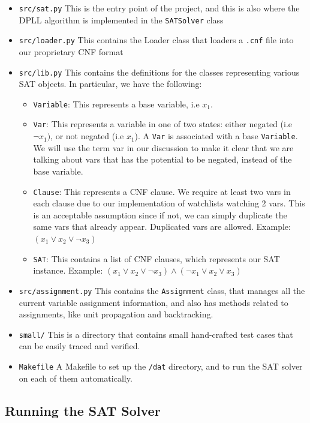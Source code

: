 \documentclass[11pt]{article}
\begin{document}
\begin{itemize}
  \item \texttt{src/sat.py} This is the entry point of the project, and this is also where the DPLL algorithm is implemented  in the \texttt{SATSolver} class
  \item \texttt{src/loader.py} This contains the \textsf{Loader} class that loaders a \texttt{.cnf} file into our proprietary CNF format
  \item \texttt{src/lib.py} This contains the definitions for the classes representing various SAT objects. In particular, we have the following:
    \begin{itemize}
      \item \texttt{Variable}: This represents a base variable, i.e $x_1$.
      \item \texttt{Var}: This represents a variable in one of two states: either negated (i.e $\neg x_1)$, or not negated (i.e $x_1$). A \texttt{Var} is associated with a base \texttt{Variable}. We will use the term var in our discussion to make it clear that we are talking about vars that has the potential to be negated, instead of the base variable.
      \item \texttt{Clause}: This represents a CNF clause. We require at least two vars in each clause due to our implementation of watchlists watching 2 vars. This is an acceptable assumption since if not, we can simply duplicate the same vars that already appear. Duplicated vars are allowed. Example: $(x_1 \vee x_2 \vee \neg x_3)$
      \item \texttt{SAT}: This contains a list of CNF clauses, which represents our SAT instance. Example: $(x_1 \vee x_2 \vee \neg x_3) \wedge (\neg x_1 \vee x_2 \vee x_3)$
    \end{itemize}
  \item \texttt{src/assignment.py} This contains the \texttt{Assignment} class, that manages all the current variable assignment information, and also has methods related to assignments, like unit propagation and backtracking.
  \item \texttt{small/} This is a directory that contains small hand-crafted test cases that can be easily traced and verified.
  \item \texttt{Makefile} A Makefile to set up the \texttt{/dat} directory, and to run the SAT solver on each of them automatically.
\end{itemize}

\subsection{Running the SAT Solver}
\end{document}
